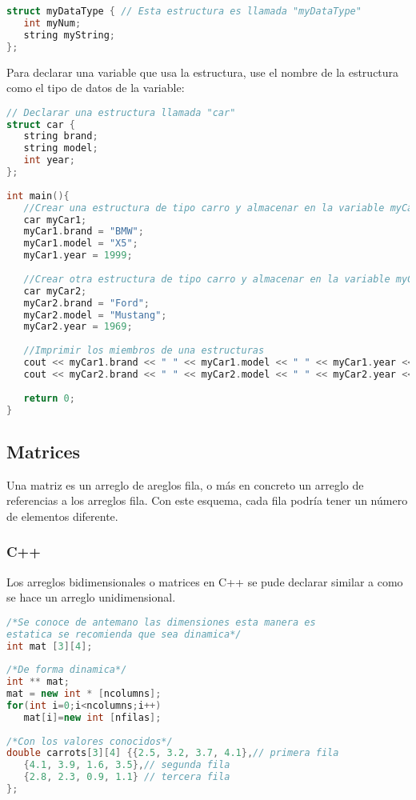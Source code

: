 \begin{lstlisting}[language=C++]
struct myDataType { // Esta estructura es llamada "myDataType"
   int myNum;
   string myString;
};
\end{lstlisting}

Para declarar una variable que usa la estructura, use el nombre de la estructura como el tipo de datos de la variable:

\begin{lstlisting}[language=C++]
// Declarar una estructura llamada "car"
struct car {
   string brand;
   string model;
   int year;
};
	
int main(){
   //Crear una estructura de tipo carro y almacenar en la variable myCar
   car myCar1;
   myCar1.brand = "BMW";
   myCar1.model = "X5";
   myCar1.year = 1999;
		
   //Crear otra estructura de tipo carro y almacenar en la variable myCar2;
   car myCar2;
   myCar2.brand = "Ford";
   myCar2.model = "Mustang";
   myCar2.year = 1969;
		
   //Imprimir los miembros de una estructuras
   cout << myCar1.brand << " " << myCar1.model << " " << myCar1.year << "\n";
   cout << myCar2.brand << " " << myCar2.model << " " << myCar2.year << "\n";
		
   return 0;
}
\end{lstlisting}

\subsection{Matrices}

Una matriz es un arreglo de areglos fila, o más en concreto un arreglo de referencias a los arreglos fila. Con este esquema, cada fila podría tener un número de elementos diferente.
\subsubsection{C++}
Los arreglos bidimensionales o matrices en C++ se pude declarar similar a como se hace un arreglo unidimensional.
\begin{lstlisting}[language=C++]
/*Se conoce de antemano las dimensiones esta manera es 
estatica se recomienda que sea dinamica*/
int mat [3][4];
	
/*De forma dinamica*/
int ** mat;
mat = new int * [ncolumns];
for(int i=0;i<ncolumns;i++)
   mat[i]=new int [nfilas];
	
/*Con los valores conocidos*/
double carrots[3][4] {{2.5, 3.2, 3.7, 4.1},// primera fila
   {4.1, 3.9, 1.6, 3.5},// segunda fila
   {2.8, 2.3, 0.9, 1.1} // tercera fila
};
	
\end{lstlisting}
